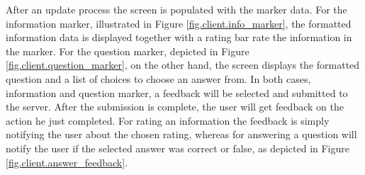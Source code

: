 \noindent After an update process the screen is populated with the marker data. For the information marker, illustrated in Figure \ref{fig.client.info_marker}, the formatted information data is displayed together with a rating bar rate the information in the marker. For the question marker, depicted in Figure \ref{fig.client.question_marker}, on the other hand, the screen displays the formatted question and a list of choices to choose an answer from. In both cases, information and question marker, a feedback will be selected and submitted to the server. After the submission is complete, the user will get feedback on the action he just completed. For rating an information the feedback is simply notifying the user about the chosen rating, whereas for answering a question will notify the user if the selected answer was correct or false, as depicted in Figure \ref{fig.client.answer_feedback}.
